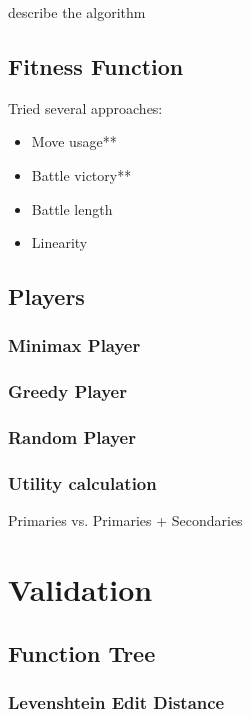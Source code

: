 \documentclass{acm_proc_article-sp}
\begin{document}
    describe the algorithm

    \subsection{Fitness Function}
    
    Tried several approaches:
    \begin{itemize}
        \item Move usage**
        \item Battle victory**
        \item Battle length
        \item Linearity
    \end{itemize}
    
    

    \subsection{Players}

        \subsubsection{Minimax Player}
    
        \subsubsection{Greedy Player}
    
        \subsubsection{Random Player}

        \subsubsection{Utility calculation}
        
            Primaries vs. Primaries + Secondaries
            
\section{Validation}

    \subsection{Function Tree}
    
        \subsubsection{Levenshtein Edit Distance}
        
\end{document}

